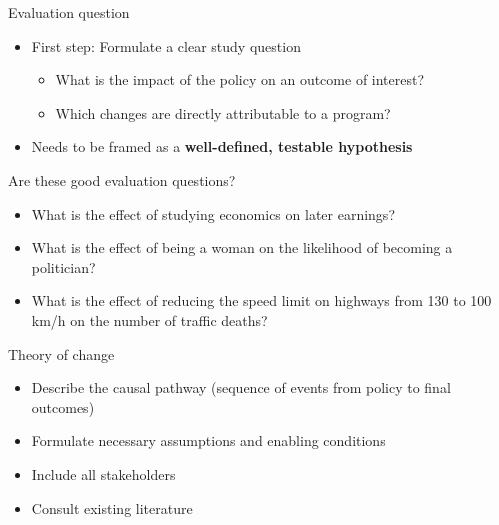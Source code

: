 \documentclass[
  ignorenonframetext,
]{beamer}
\providecommand{\tightlist}{%
  \setlength{\itemsep}{0pt}\setlength{\parskip}{0pt}}
\begin{document}
\begin{frame}{Evaluation question}
\label{evaluation-question}
\begin{itemize}
\tightlist
\item
  First step: Formulate a clear study question

  \begin{itemize}
  \tightlist
  \item
    What is the impact of the policy on an outcome of interest?\\
  \item
    Which changes are directly attributable to a program?\\
  \end{itemize}
\item
  Needs to be framed as a \textbf{well-defined, testable hypothesis}
\end{itemize}
\end{frame}

\begin{frame}{Are these good evaluation questions?}
\label{are-these-good-evaluation-questions}
\begin{itemize}
\tightlist
\item
  What is the effect of studying economics on later earnings?\\
\item
  What is the effect of being a woman on the likelihood of becoming a
  politician?\\
\item
  What is the effect of reducing the speed limit on highways from 130 to
  100 km/h on the number of traffic deaths?
\end{itemize}
\end{frame}

\begin{frame}{Theory of change}
\label{theory-of-change}
\begin{itemize}
\tightlist
\item
  Describe the causal pathway (sequence of events from policy to final
  outcomes)\\
\item
  Formulate necessary assumptions and enabling conditions\\
\item
  Include all stakeholders\\
\item
  Consult existing literature
\end{itemize}
\end{frame}
\end{document}
